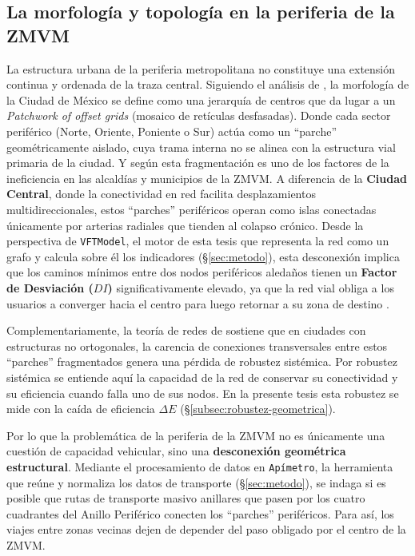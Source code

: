 \subsection{La morfología y topología en la periferia de la ZMVM}
\label{subsec:morfologia}

La estructura urbana de la periferia metropolitana no constituye una extensión
continua y ordenada de la traza central. Siguiendo el análisis de
\citet{ortiz2007}, la morfología de la Ciudad de México se define como una
jerarquía de centros que da lugar a un \textit{Patchwork of offset grids}
(mosaico de retículas desfasadas). Donde cada sector periférico
(Norte, Oriente, Poniente o Sur) actúa como un ``parche'' geométricamente
aislado, cuya trama interna no se alinea con la estructura vial primaria de la
ciudad. Y según \citet{ortiz2007} esta fragmentación  es uno de los factores 
 de la ineficiencia en las alcaldías y municipios de la 
 ZMVM. A diferencia de la
\textbf{Ciudad Central}, donde la conectividad en red facilita desplazamientos
multidireccionales, estos ``parches'' periféricos operan como islas conectadas
únicamente por arterias radiales que tienden al colapso crónico. Desde la
perspectiva de \texttt{VFTModel}, el motor de esta tesis que representa la red
como un grafo y calcula sobre él los indicadores (§\ref{sec:metodo}), esta
desconexión implica que los
caminos mínimos entre dos nodos periféricos aledaños tienen un
\textbf{Factor de Desviación ($DI$)} significativamente elevado, ya que la red
vial obliga a los usuarios a converger hacia el centro para luego retornar a su
zona de destino \citep{fortin2016innovative}.

Complementariamente, la teoría de redes de \citet{owais2020} sostiene que en
ciudades con estructuras no ortogonales, la carencia de conexiones transversales
entre estos ``parches'' fragmentados genera una pérdida de robustez sistémica. Por
robustez sistémica se entiende aquí la capacidad de la red de conservar su
conectividad y su eficiencia cuando falla uno de sus nodos. En la 
presente tesis esta robustez se mide
con la caída de eficiencia $\Delta E$ (§\ref{subsec:robustez-geometrica}). 

Por lo que la problemática de la periferia
de la ZMVM no es únicamente una cuestión de capacidad vehicular, sino una
\textbf{desconexión geométrica estructural}. Mediante el procesamiento de datos
en \texttt{Apímetro}, la herramienta que reúne y normaliza los datos de
transporte (§\ref{sec:metodo}), se indaga si es posible que rutas de transporte masivo anillares que pasen por los cuatro cuadrantes
del Anillo Periférico conecten los ``parches'' periféricos. 
Para así, los viajes
entre zonas vecinas dejen de depender del paso obligado por
el centro de la ZMVM.


